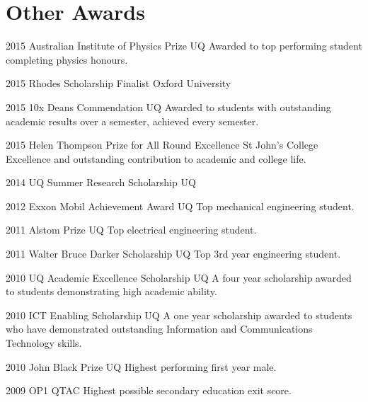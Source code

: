 \documentclass[]{friggeri-cv} %
\begin{document}
\section{Other Awards}
\begin{entrylist}
	\entryInlineSmall
	{2015}
	{Australian Institute of Physics Prize}
	{UQ}
	{Awarded to top performing student completing physics honours.}
\end{entrylist}
\begin{entrylist}
	\entryInlineSmall
	{2015}
	{Rhodes Scholarship Finalist}
	{Oxford University}
	{}
\end{entrylist}
\begin{entrylist}
\entryInlineSmall
{2015}
{10x Deans Commendation}
{UQ}
{Awarded to students with outstanding academic results over a semester, achieved every semester.}
\end{entrylist}
\begin{entrylist}
\entryInlineSmall
{2015}
{Helen Thompson Prize for All Round Excellence}
{St John's College}
{Excellence and outstanding contribution to academic and college life.}
\end{entrylist}
\begin{entrylist}
\entryInlineSmall
{2014}
{UQ Summer Research Scholarship}
{UQ}
{}
\end{entrylist}
\begin{entrylist}
\entryInline
{2012}
{Exxon Mobil Achievement Award}
{UQ}
{Top mechanical engineering student.}
\end{entrylist}
\begin{entrylist}
\entryInline
{2011}
{Alstom Prize}
{UQ}
{Top electrical engineering student.}
\end{entrylist}
\begin{entrylist}
\entryInline
{2011}
{Walter Bruce Darker Scholarship}
{UQ}
{Top 3rd year engineering student.}
\end{entrylist}
\begin{entrylist}
\entryInlineSmall
{2010}
{UQ Academic Excellence Scholarship}
{UQ}
{A four year scholarship awarded to students demonstrating high academic ability.}
\end{entrylist}
\begin{entrylist}
\entryInlineSmall
{2010}
{ICT Enabling Scholarship}
{UQ}
{A one year scholarship awarded to students who have demonstrated outstanding Information and Communications Technology skills.}
\end{entrylist}
\begin{entrylist}
\entryInline
{2010}
{John Black Prize}
{UQ}
{Highest performing first year male.}
\end{entrylist}
\begin{entrylist}
\entryInline
{2009}
{OP1}
{QTAC}
{Highest possible secondary education exit score.}
\end{entrylist}
\end{document}
